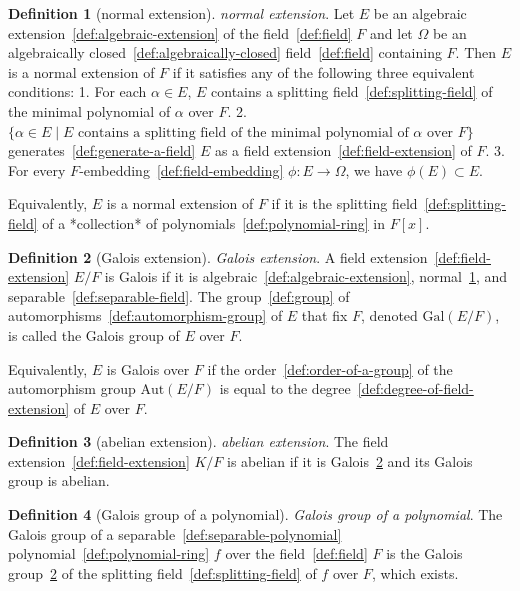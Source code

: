 \documentclass[12pt,a4paper]{article}
\theoremstyle{definition}
\newtheorem{definition}{Definition}
\begin{document}
\begin{definition}[normal extension]\label{def:normal-extension}
\emph{normal extension}. Let $E$ be an algebraic extension~\ref{def:algebraic-extension} of the field~\ref{def:field} $F$ and let $\Omega$ be an algebraically closed~\ref{def:algebraically-closed} field~\ref{def:field} containing $F$. Then $E$ is a normal extension of $F$ if it satisfies any of the following three equivalent conditions:
1. For each $\alpha\in E$, $E$ contains a splitting field~\ref{def:splitting-field} of the minimal polynomial of $\alpha$ over $F$.
2. $\{\alpha\in E\mid E \text{ contains a splitting field of the minimal polynomial of } \alpha \text{ over } F\}$ generates~\ref{def:generate-a-field} $E$ as a field extension~\ref{def:field-extension} of $F$.
3. For every $F$-embedding~\ref{def:field-embedding} $\phi:E\to \Omega$, we have $\phi(E) \subset E$. 

Equivalently, $E$ is a normal extension of $F$ if it is the splitting field~\ref{def:splitting-field} of a *collection* of polynomials~\ref{def:polynomial-ring} in $F[x]$.
\end{definition}

\begin{definition}[Galois extension]\label{def:galois-extension}
\emph{Galois extension}. A field extension~\ref{def:field-extension} $E/F$ is Galois if it is algebraic~\ref{def:algebraic-extension}, normal~\ref{def:normal-extension}, and separable~\ref{def:separable-field}. The group~\ref{def:group} of automorphisms~\ref{def:automorphism-group} of $E$ that fix $F$, denoted $\text{Gal}(E/F)$, is called the Galois group of $E$ over $F$. 

Equivalently, $E$ is Galois over $F$ if the order~\ref{def:order-of-a-group} of the automorphism group $\text{Aut}(E/F)$ is equal to the degree~\ref{def:degree-of-field-extension} of $E$ over $F$.
\end{definition}

\begin{definition}[abelian extension]\label{def:abelian-extension}
\emph{abelian extension}. The field extension~\ref{def:field-extension} $K/F$ is abelian if it is Galois~\ref{def:galois-extension} and its Galois group is abelian.
\end{definition}

\begin{definition}[Galois group of a polynomial]\label{def:galois-group-of-a-polynomial}
\emph{Galois group of a polynomial}. The Galois group of a separable~\ref{def:separable-polynomial} polynomial~\ref{def:polynomial-ring} $f$ over the field~\ref{def:field} $F$ is the Galois group~\ref{def:galois-extension} of the splitting field~\ref{def:splitting-field} of $f$ over $F$, which exists.
\end{definition}
\end{document}
